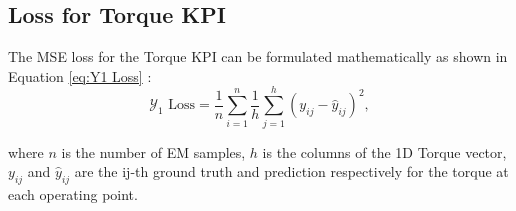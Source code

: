 \documentclass{report} %
\begin{document}
\subsection{Loss for Torque KPI}\label{sec:Loss for 2D KPI}

The \ac{MSE} loss for the Torque \ac{KPI} can be formulated mathematically as shown in Equation \ref{eq:Y1 Loss} :
\begin{equation}
    \text{$\mathcal{Y}_1$ Loss} = \frac{1}{n} \sum_{i=1}^{n} \frac{1}{h} \sum_{j=1}^{h} (y_{ij} - \hat{y}_{ij})^2,
    \label{eq:Y1 Loss}
\end{equation} 

where \(n\) is the number of \ac{EM} samples, \(h\) is the columns of the 1D Torque vector, \(y_{ij}\) and $\hat{y}_{ij}$ are the ij-th ground truth and prediction 
respectively for the torque at each operating point.\\
\end{document}
